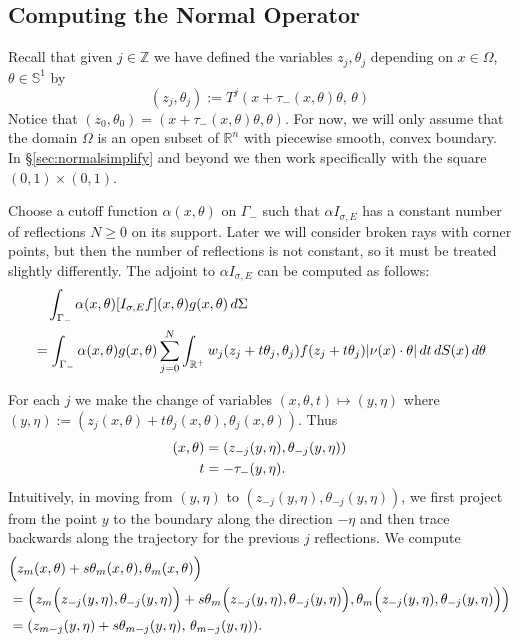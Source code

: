 \documentclass[10pt]{amsart}
\theoremstyle{definition}
\theoremstyle{definition}
\theoremstyle{definition}
\newcommand{ \rn }[1]{\mathbb{R}^{#1}}
\begin{document}
\subsection{Computing the Normal Operator\label{sec:normaloperatorcompute}}
Recall that given $j \in \mathbb{Z}$ we have defined the variables $z_{j},\theta_{j}$ depending on $x \in \Omega$, $\theta \in \mathbb{S}^{1}$ by
\begin{equation*}
(z_{j}, \theta_{j}) := T^{j}(x+\tau_{-}(x,\theta)\theta,\, \theta)
\end{equation*}
Notice that $(z_{0},\theta_{0}) = (x + \tau_{-}(x,\theta)\theta, \theta)$. For now, we will only assume that the domain $\Omega$ is an open subset of $\rn{n}$ with piecewise smooth, convex boundary. In \S \ref{sec:normalsimplify} and beyond we then work specifically with the square $(0,1) \times (0,1)$.

Choose a cutoff function $\alpha(x,\theta)$ on $\Gamma_{-}$ such that $\alpha I_{\sigma, E}$ has a constant number of reflections $N \geq 0$ on its support. Later we will consider broken rays with corner points, but then the number of reflections is not constant, so it must be treated slightly differently. The adjoint to $\alpha I_{\sigma,E}$ can be computed as follows:
\begin{align}
& \quad \int_{\Gamma_{-}}\alpha(x,\theta) [I_{\sigma,E}f](x,\theta) g(x,\theta)\,d\Sigma \label{eq:adjointcomputation}\\
& = \int_{\Gamma_{-}}\alpha(x,\theta) g(x,\theta) \sum_{j=0}^{N}\int_{\rn{+}} w_{j}(z_{j}+t\theta_{j},\theta_{j})f(z_{j} + t \theta_{j})|\nu(x) \cdot \theta|\,dt\,dS(x)\,d\theta \notag
\end{align}

For each $j$ we make the change of variables $(x,\theta,t) \mapsto (y,\eta)$ where $(y,\eta) := (z_{j}(x,\theta)+t\theta_{j}(x,\theta), \theta_{j}(x,\theta))$. Thus
\begin{align}
(x,\theta) & = (z_{-j}(y,\eta), \theta_{-j}(y,\eta))\notag\\
t & = -\tau_{-}(y,\eta).
\end{align}
Intuitively, in moving from $(y,\eta)$ to $\left( z_{-j}(y,\eta), \theta_{-j}(y,\eta) \right)$, we first project from the point $y$ to the boundary along the direction $-\eta$ and then trace backwards along the trajectory for the previous $j$ reflections. We compute
\begin{align}
& \Big(z_{m}(x,\theta) + s\theta_{m}(x,\theta), \theta_{m}(x,\theta)\Big)\notag\\
& = \left(z_{m}\Big(z_{-j}(y,\eta), \theta_{-j}(y,\eta)\Big) + s\theta_{m}\Big(z_{-j}(y,\eta), \theta_{-j}(y,\eta)\Big), \theta_{m}\Big(z_{-j}(y,\eta), \theta_{-j}(y,\eta)\Big)\right)\notag\\
& = (z_{m-j}(y,\eta)+s\theta_{m-j}(y,\eta), \, \theta_{m-j}(y,\eta)).\notag
\end{align}
\end{document}
